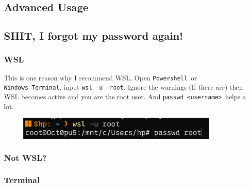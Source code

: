 \documentclass[12pt]{ctexart}
\begin{document}
\newpage
\thispagestyle{empty}
\begin{center}
    \vspace*{96pt}
    \fontsize{60}{60}\par
    \fontsize{26}{31.2}\section{\textbf{Advanced Usage}}\par %
    \vspace{25pt}
    \fontsize{18}{21.6}\par %
    \vfill
\end{center}

\fontsize{12}{14}
\newpage
\subsection{\textbf{SHIT, I forgot my password again!}}

\subsubsection{\textbf{WSL}}

This is one reason why I recommend WSL. Open \texttt{Powershell}\ or
\texttt{Windows\ Terminal}, input \texttt{wsl\ -u\ -root}. Ignore the
warnings (If there are) then WSL becomes active and you are the root
user. And \texttt{passwd\ \textless{}username\textgreater{}}\ helps a
lot.

\begin{figure}[H]
    \centering
    \includegraphics[width=0.9\textwidth,keepaspectratio]{assets/Linux/2.1 SHIT, I forgot my password again!/1.png}
\end{figure}

\subsubsection{\textbf{Not WSL?}}

\subsubsection*{\textbf{Terminal}}
\end{document}
